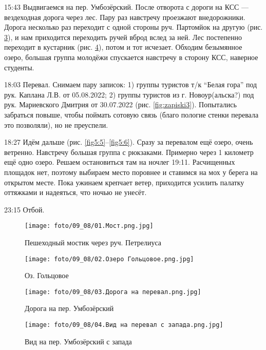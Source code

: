 15:43 Выдвигаемся на пер. Умбозёрский. После отворота с дороги на КСС --- вездеходная дорога через лес.
Пару раз навстречу проезжают внедорожники. Дорога несколько раз переходит с одной стороны руч. Партомйок на другую
(рис. \ref{fig5:3}),
и нам приходится переходить ручей вброд вслед за ней. Лес постепенно переходит в кустарник (рис. \ref{fig5:4}),
потом и тот исчезает.
Обходим безымянное озеро, большая группа молодёжи спускается навстречу в сторону КСС, наверное студенты.

18:03 Перевал. Снимаем пару записок: 1) группы туристов т/к ``Белая гора'' под рук. Каплана Л.В. от 05.08.2022;
2) группы туристов из г. Новоур(альска?) под рук. Мариевского Дмитрия от 30.07.2022 (рис. \ref{fig:zapiski3}).
Попытались забраться повыше, чтобы поймать сотовую связь (благо пологие стенки перевала это позволяли), но не преуспели.

18:27 Идём дальше (рис. \ref{fig5:5}--\ref{fig5:6}). Сразу за перевалом ещё озеро, очень ветренно. Навстречу большая группа
с рюкзаками.  Примерно через 1 километр ещё одно озеро. Решаем остановиться там на ночлег 19:11.
Расчищенных площадок нет, поэтому выбираем место поровнее и ставимся на мох у берега на открытом месте.
Пока ужинаем крепчает ветер, приходится усилить палатку оттяжками и надеяться, что ночью не унесёт.

23:15 Отбой.

\begin{figure}
    \centering
    \texttt{[image: foto/09\_08/01.Мост.png.jpg]}
    \caption{Пешеходный мостик через руч. Петрелиуса}
    \label{fig5:1}
\end{figure}

\begin{figure}
    \centering
    \texttt{[image: foto/09\_08/02.Озеро Гольцовое.png.jpg]}
    \caption{Оз. Гольцовое}
    \label{fig5:2}
\end{figure}

\begin{figure}
    \centering
    \texttt{[image: foto/09\_08/03.Дорога на перевал.png.jpg]}
    \caption{Дорога на пер. Умбозёрский}
    \label{fig5:3}
\end{figure}

\begin{figure}
    \centering
    \texttt{[image: foto/09\_08/04.Вид на перевал с запада.png.jpg]}
    \caption{Вид на пер. Умбозёрский с запада}
    \label{fig5:4}
\end{figure}

